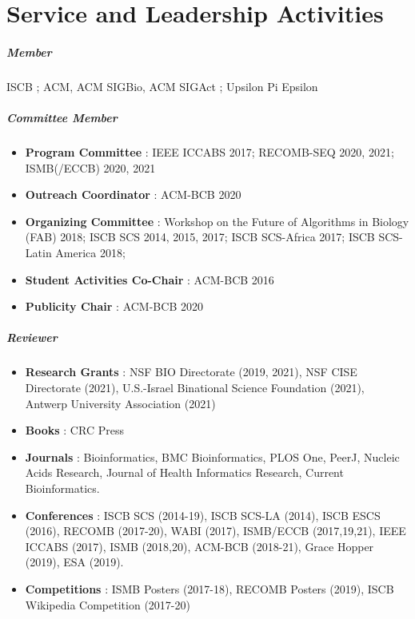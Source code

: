 \documentclass[10pt,letterpaper]{article}
\begin{document}
\section*{Service and Leadership Activities}


\subparagraph{Member} 
ISCB
; ACM, ACM SIGBio, ACM SIGAct
; Upsilon Pi Epsilon

\subparagraph{Committee Member} 
\begin{itemize}[leftmargin=!,labelindent=5pt,itemindent=-15pt]
    \item \textbf{Program Committee} : IEEE ICCABS 2017; RECOMB-SEQ 2020, 2021; ISMB(/ECCB) 2020, 2021
    \item \textbf{Outreach Coordinator} : ACM-BCB 2020
    \item \textbf{Organizing Committee} : Workshop on the Future of Algorithms in Biology (FAB) 2018; 
    ISCB SCS 2014, 2015, 2017;  
    ISCB SCS\nobreakdash-Africa 2017; 
    ISCB SCS-Latin America 2018;  
    \item \textbf{Student Activities Co-Chair} : ACM-BCB 2016
    \item \textbf{Publicity Chair} : ACM-BCB 2020
\end{itemize}

\subparagraph{Reviewer} 
\begin{itemize}[leftmargin=!,labelindent=5pt,itemindent=-15pt]
    \item \textbf{Research Grants} : 
    	NSF BIO Directorate (2019, 2021), 
    	NSF CISE Directorate (2021), 
	U.S.-Israel Binational Science Foundation (2021), 
	Antwerp University Association (2021)
    \item \textbf{Books} : 
    	CRC Press
    \item \textbf{Journals} :
        Bioinformatics,
        BMC Bioinformatics, 
        PLOS One, 
        PeerJ, 
        Nucleic Acids Research, 
        Journal of Health Informatics Research,
        Current Bioinformatics.
    \item \textbf{Conferences} :
        ISCB SCS (2014-19), %
        ISCB SCS-LA (2014), %
        ISCB ESCS (2016), %
	RECOMB (2017-20), %
	WABI (2017), %
	ISMB/ECCB (2017,19,21), %
    	IEEE ICCABS (2017), %
	ISMB (2018,20), %
	ACM-BCB (2018-21), %
	Grace Hopper (2019), %
	ESA (2019). %
     \item \textbf{Competitions} : 
     	ISMB Posters (2017-18),
	RECOMB Posters (2019), 
     	ISCB Wikipedia Competition (2017-20)
\end{itemize}
\end{document}
